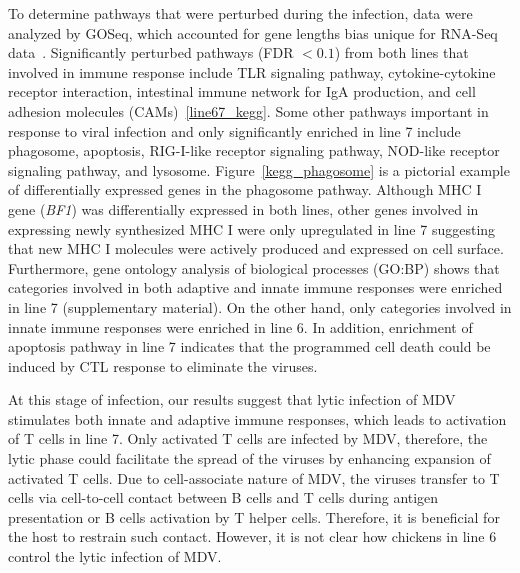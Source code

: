 \documentclass[10pt]{article}
\begin{document}
To determine pathways that were perturbed during the infection, data were
analyzed by GOSeq, which accounted for gene lengths bias unique for RNA-Seq data~\cite{young2010method}.
Significantly perturbed pathways (FDR $< 0.1$) from both lines that involved in
immune response include TLR signaling pathway, cytokine-cytokine receptor interaction,
intestinal immune network for IgA production, and cell adhesion molecules (CAMs)~\ref{line67_kegg}.
Some other pathways important in response to viral infection and only significantly
enriched in line 7 include phagosome, apoptosis, RIG-I-like receptor signaling pathway,
NOD-like receptor signaling pathway, and lysosome.
Figure~\ref{kegg_phagosome} is a pictorial example of differentially expressed
genes in the phagosome pathway.
Although MHC I gene (\textit{BF1}) was differentially expressed in both lines, other genes involved in
expressing newly synthesized MHC I were only upregulated in line 7
suggesting that new MHC I molecules were actively produced and expressed on cell surface.
Furthermore, gene ontology analysis of biological processes (GO:BP) shows that categories involved in
both adaptive and innate immune responses were enriched in line 7 (supplementary material).
On the other hand, only categories involved in innate immune responses were enriched in line 6.
In addition, enrichment of apoptosis pathway in line 7 indicates that the programmed
cell death could be induced by CTL response to eliminate the viruses.

At this stage of infection, our results suggest that lytic infection of MDV stimulates
both innate and adaptive immune responses, which leads to activation of T cells in line 7.
Only activated T cells are infected by MDV, therefore, the lytic phase could facilitate the spread of
the viruses by enhancing expansion of activated T cells.
Due to cell-associate nature of MDV, the viruses transfer to T cells via cell-to-cell
contact between B cells and
T cells during antigen presentation or B cells activation by T helper cells.
Therefore, it is beneficial for the host to restrain such contact.
However, it is not clear how chickens in line 6 control the lytic infection of MDV.
\end{document}
